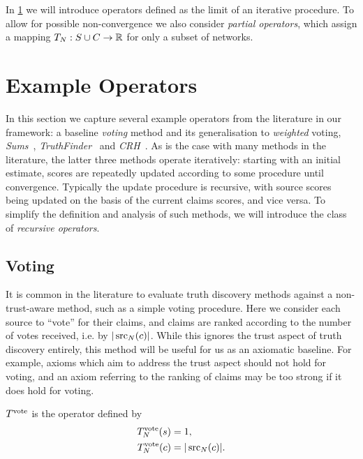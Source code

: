 In \cref{td_new_sec_example_operators} we will introduce operators defined as
the limit of an iterative procedure. To allow for possible non-convergence we
also consider \emph{partial operators}, which assign a mapping $T_N: S \cup C
\to \mathbb{R}$ for only a subset of networks.

\section{Example Operators}
\label{td_new_sec_example_operators}

In this section we capture several example operators from the literature in our
framework: a baseline \emph{voting} method and its generalisation to
\emph{weighted} voting, \emph{Sums}~\cite{pasternack2010},
\emph{TruthFinder}~\cite{yin2008} and \emph{CRH}~\cite{li2016}. As is the case
with many methods in the literature, the latter three methods operate
iteratively: starting with an initial estimate, scores are repeatedly updated
according to some procedure until convergence. Typically the update procedure
is recursive, with source scores being updated on the basis of the current
claims scores, and vice versa.  To simplify the definition and analysis of such
methods, we will introduce the class of \emph{recursive operators}.

\subsection{Voting}
\label{td_new_sec_voting}

It is common in the literature to evaluate truth discovery methods against a
non-trust-aware method, such as a simple voting procedure.\footnotemark{} Here
we consider each source to ``vote'' for their claims, and claims are ranked
according to the number of votes received, i.e. by $|\operatorname{src}_N(c)|$. While this
ignores the trust aspect of truth discovery entirely, this method will be
useful for us as an axiomatic baseline. For example, axioms which aim to
address the trust aspect should not hold for voting, and an axiom referring to
the ranking of claims may be too strong if it does hold for voting.


\begin{definition}
    $T^{\operatorname{vote}}$ is the operator defined by
    \begin{align*}
        T^{\operatorname{vote}}_N(s) &= 1,\\
        T^{\operatorname{vote}}_N(c) &= |\operatorname{src}_N(c)|.
    \end{align*}
\end{definition}

